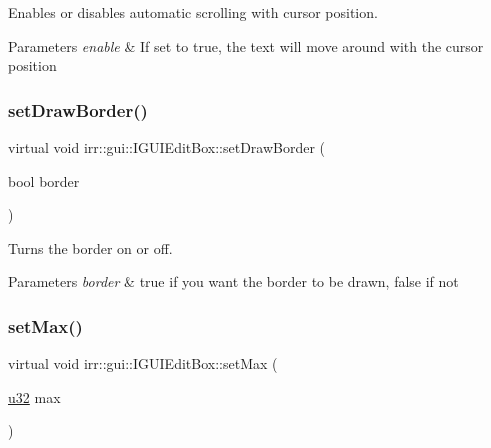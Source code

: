 Enables or disables automatic scrolling with cursor position. 


\begin{DoxyParams}{Parameters}
{\em enable} & If set to true, the text will move around with the cursor position \\
\hline
\end{DoxyParams}
\mbox{\label{classirr_1_1gui_1_1IGUIEditBox_a37094bd4bc6b82a184bd1d7864f7ea18}} 
\subsubsection{\texorpdfstring{set\+Draw\+Border()}{setDrawBorder()}}
{\footnotesize\ttfamily virtual void irr\+::gui\+::\+I\+G\+U\+I\+Edit\+Box\+::set\+Draw\+Border (\begin{DoxyParamCaption}\item[{bool}]{border }\end{DoxyParamCaption})\hspace{0.3cm}{\ttfamily [pure virtual]}}



Turns the border on or off. 


\begin{DoxyParams}{Parameters}
{\em border} & true if you want the border to be drawn, false if not \\
\hline
\end{DoxyParams}
\mbox{\label{classirr_1_1gui_1_1IGUIEditBox_a5253ed6b422e129356e56f8e2a610be5}} 
\subsubsection{\texorpdfstring{set\+Max()}{setMax()}}
{\footnotesize\ttfamily virtual void irr\+::gui\+::\+I\+G\+U\+I\+Edit\+Box\+::set\+Max (\begin{DoxyParamCaption}\item[{\hyperlink{namespaceirr_a0416a53257075833e7002efd0a18e804}{u32}}]{max }\end{DoxyParamCaption})\hspace{0.3cm}{\ttfamily [pure virtual]}}



